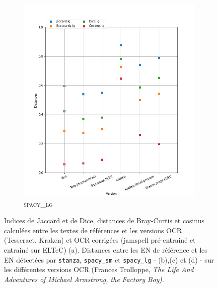 \begin{figure}
\begin{minipage}{6cm}
\begin{subfigure}{0.89\textwidth}
  \includegraphics[width=.89\textwidth]{IMAGES/ELTeC_DISTANCES_spaCy3.5.1/TROLLOPE-graph-dist-spaCy3.5.1-lg.png}
   \caption{\textsc{spacy\_lg}}
  \label{fig:TROLLOPE-graph-dist-spaCy3.5.1-lg }
  \end{subfigure}
  \end{minipage}
\caption{Indices de Jaccard et de Dice, distances de Bray-Curtis et cosinus calculées entre les textes de références et les versions OCR (Tesseract, Kraken) et OCR corrigées (jamspell pré-entrainé et entrainé sur ELTeC) (a). Distances entre les EN de référence et les EN détectées par \texttt{stanza}, \texttt{spacy\_sm} et \texttt{spacy\_lg} - (b),(c) et (d) - sur les différentes versions OCR (Frances Trolloppe, \textit{The Life And Adventures of Michael Armstrong, the Factory Boy)}.}
\label{fig:}
\end{figure}


